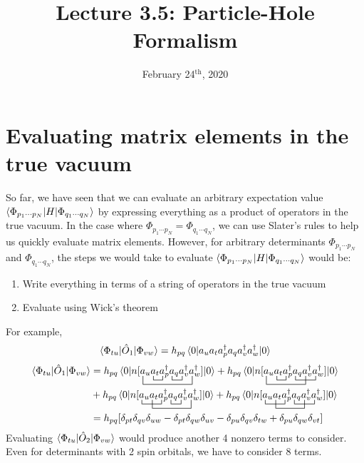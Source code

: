 \documentclass{article}
\title{Lecture 3.5: Particle-Hole Formalism}
\date{February 24$^{\text{th}}$, 2020}
\newcommand{\ctr}{\bcontraction}
\newcommand{\dg}{\ensuremath{^\dagger} }
\newcommand{\cd}{\ensuremath{\cdots} }
\begin{document}
\maketitle
\noindent

\section{Evaluating matrix elements in the true vacuum}
So far, we have seen that we can evaluate an arbitrary expectation value $\braket{\Phi_{p_1 \cd p_N} | H | \Phi_{q_1 \cd q_N}}$ by expressing everything as 
a product of operators in the true vacuum. 
In the case where $\Phi_{p_1 \cd p_N} =  \Phi_{q_1 \cd q_N}$, we can use Slater's rules to help us quickly evaluate matrix elements. 
However, for arbitrary determinants $\Phi_{p_1 \cd p_N}$ and $\Phi_{q_1 \cd q_N}$, the steps we would take to evaluate $\braket{\Phi_{p_1 \cd p_N} | H | \Phi_{q_1 \cd q_N}}$ would be:
\begin{enumerate}
\item Write everything in terms of a string of operators in the true vacuum
\item Evaluate using Wick's theorem
\end{enumerate}
For example,
\[\braket{\Phi_{tu}|\hat{O}_1| \Phi_{vw}} = h_{pq} \braket{0| a_u a_t a_p\dg a_q a_v\dg a_w\dg | 0}  \] 
%
\begin{align*}
\braket{\Phi_{tu}|\hat{O}_1| \Phi_{vw}} &= h_{pq} \braket{0| n[
\ctr{a_u}{a}{{}_t}{a}
\ctr{a_u a_t a_p\dg }{a}{{}_q}{a}
\ctr[2ex]{}{a}{{}_u a_t a_p\dg a_q a_v\dg }{a}
a_u a_t a_p\dg a_q a_v\dg a_w\dg] | 0}  
+ h_{pq} \braket{0| n[
\ctr{a_u}{a}{{}_t}{a}
\ctr{a_u a_t a_p\dg }{a}{{}_q a_v\dg }{a}
\ctr[2ex]{}{a}{{}_u a_t a_p\dg a_q }{a}
a_u a_t a_p\dg a_q a_v\dg a_w\dg] | 0}  
\\
&+ h_{pq} \braket{0| n[
\ctr{}{a}{{}_u a_t}{a}
\ctr{a_u a_t a_p\dg }{a}{{}_q}{a}
\ctr[2ex]{a_u}{a}{{}_t a_p\dg a_q a_v\dg }{a}
a_u a_t a_p\dg a_q a_v\dg a_w\dg] | 0}  
+ h_{pq} \braket{0| n[
\ctr{}{a}{{}_u a_t}{a}
\ctr{a_u a_t a_p\dg }{a}{{}_q a_v\dg }{a}
\ctr[2ex]{a_u}{a}{{}_t a_p\dg a_q }{a}
a_u a_t a_p\dg a_q a_v\dg a_w\dg] | 0}  
\\
&= h_{pq} [\delta_{pt}\delta_{qv}\delta_{uw} - \delta_{pt}\delta_{qw}\delta_{uv} - \delta_{pu}\delta_{qv}\delta_{tw} +  \delta_{pu}\delta_{qw}\delta_{vt} ]
\end{align*}
Evaluating $\braket{\Phi_{tu}|\hat{O}_2| \Phi_{vw}}$ would produce another 4 nonzero terms to consider. 
Even for determinants with 2 spin orbitals, we have to consider 8 terms. 
\end{document}
